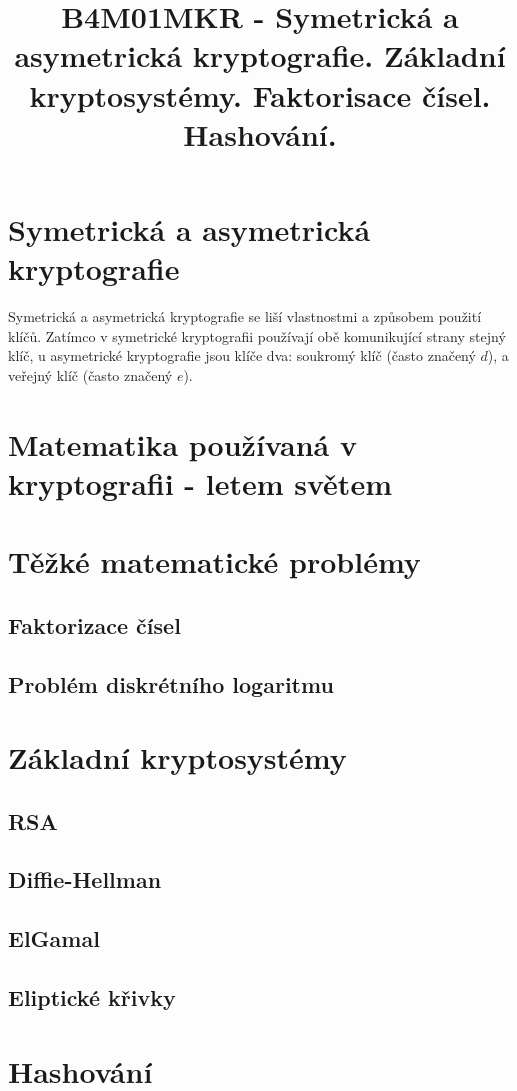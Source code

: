 \documentclass[10pt,a4paper]{article}
\title{B4M01MKR - Symetrická a asymetrická kryptografie. Základní kryptosystémy. Faktorisace čísel. Hashování.}
\date{}
\begin{document}
\maketitle
\section{Symetrická a asymetrická kryptografie}
Symetrická a asymetrická kryptografie se liší vlastnostmi a způsobem použití klíčů. Zatímco v symetrické kryptografii používají obě komunikující strany stejný klíč, u asymetrické kryptografie jsou klíče dva: soukromý klíč (často značený $d$), a veřejný klíč (často značený $e$).

\section{Matematika používaná v kryptografii - letem světem}

\section{Těžké matematické problémy}
\subsection{Faktorizace čísel}
\subsection{Problém diskrétního logaritmu}

\section{Základní kryptosystémy}
\subsection{RSA}
\subsection{Diffie-Hellman}
\subsection{ElGamal}
\subsection{Eliptické křivky}

\section{Hashování}
\end{document}
